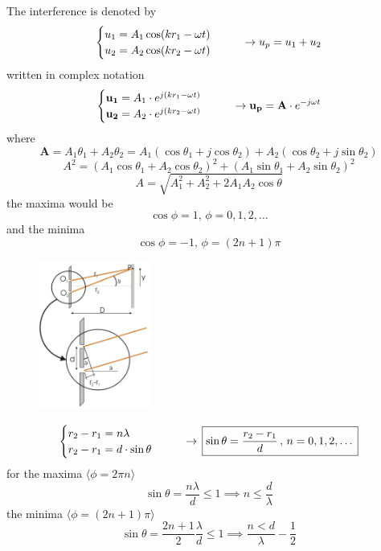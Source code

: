 \documentclass[a4paper]{article}
\begin{document}
The interference is denoted by
$$
\begin{cases}
u_{1}=A_{1}\cos(kr_{1}-\omega t) \\
u_{2}=A_{2}\cos(kr_{2}-\omega t)
\end{cases}\hspace{4ex}\to u_{p}=u_{1}+u_{2}
$$
written in complex notation
$$
\begin{cases}
\mathbf{u_{1}}=A_{1}\cdot e^{ j(kr_{1}-\omega t) } \\
\mathbf{u_{2}}=A_{2}\cdot e^{ j(kr_{2}-\omega t) }
\end{cases}\hspace{4ex}\to \mathbf{u_{p}}=\mathbf{A}\cdot e^{ -j\omega t }
$$
where
$$
\mathbf{A}=A_{1}\theta_{1}+A_{2}\theta_{2}=A_{1}(\cos \theta_{1}+j\cos \theta_{2})+A_{2}(\cos \theta_{2}+j\sin \theta_{2})
$$
$$
A^{2}=(A_{1}\cos \theta_{1}+A_{2}\cos \theta_{2})^{2}+(A_{1}\sin \theta_{1}+A_{2}\sin \theta_{2})^{2}
$$
$$
\boxed{A=\sqrt{ A_{1}^{2}+A_{2}^{2}+2A_{1}A_{2}\cos \theta }}
$$
the maxima would be 
$$\cos \phi=1,\,\phi=0,1,2,\dots$$
and the minima
$$
\cos \phi=-1,\,\phi=(2n+1)\pi
$$


\begin{figure}[H]
    \centering
    \includegraphics[width=0.33\textwidth]{IMG/theta.png}
    \caption{}
    \label{fig:theta}
\end{figure}

$$
\begin{cases}
r_{2}-r_{1}=n\lambda \\
r_{2}-r_{1}=d\cdot \sin \theta
\end{cases}\hspace{4ex}\to\,\boxed{\sin \theta=\frac{r_{2}-r_{1}}{d}\,,\, n=0,1,2,\dots}
$$
for the maxima $\langle \phi=2\pi n \rangle$ 
$$
\sin \theta=\frac{n\lambda}{d}\leq 1\implies n\leq \frac{d}{\lambda}
$$
the minima $\langle \phi=(2n+1)\pi \rangle$
$$
\sin \theta=\frac{2n+1}{2} \frac{\lambda}{d}\leq 1\implies \frac{n<d}{\lambda}-\frac{1}{2}
$$
\end{document}
